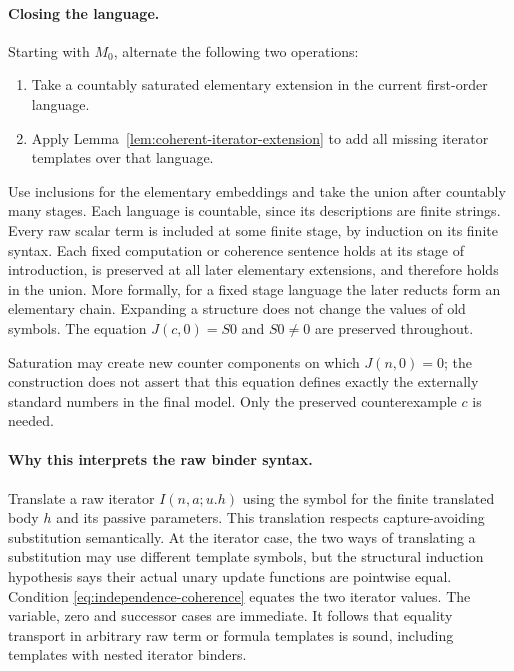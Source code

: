 \paragraph{Closing the language.}
Starting with $M_0$, alternate the following two operations:

\begin{enumerate}
\item Take a countably saturated elementary extension in the current
first-order language.
\item Apply Lemma~\ref{lem:coherent-iterator-extension} to add all
missing iterator templates over that language.
\end{enumerate}

Use inclusions for the elementary embeddings and take the union after
countably many stages.  Each language is countable, since its
descriptions are finite strings.  Every raw scalar term is included
at some finite stage, by induction on its finite syntax.  Each fixed
computation or coherence sentence holds at its stage of introduction,
is preserved at all later elementary extensions, and therefore holds
in the union.  More formally, for a fixed stage language the later
reducts form an elementary chain.  Expanding a structure does not
change the values of old symbols.  The equation $J(c,0)=S0$ and
$S0\ne0$ are preserved throughout.

Saturation may create new counter components on which $J(n,0)=0$;
the construction does not assert that this equation defines exactly
the externally standard numbers in the final model.  Only the
preserved counterexample $c$ is needed.

\paragraph{Why this interprets the raw binder syntax.}
Translate a raw iterator $I(n,a;u.h)$ using the symbol for the finite
translated body $h$ and its passive parameters.  This translation
respects capture-avoiding substitution semantically.  At the iterator
case, the two ways of translating a substitution may use different
template symbols, but the structural induction hypothesis says their
actual unary update functions are pointwise equal.  Condition
\eqref{eq:independence-coherence} equates the two iterator values.
The variable, zero and successor cases are immediate.  It follows
that equality transport in arbitrary raw term or formula templates
is sound, including templates with nested iterator binders.

